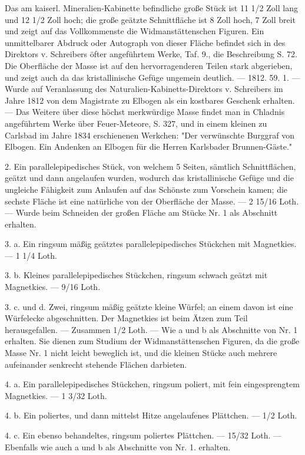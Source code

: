 \documentclass[a4paper, 11pt, oneside, polutonikogreek, german]{article}
\begin{document}
Das am kaiserl. Mineralien-Kabinette befindliche große Stück ist 11 1/2 Zoll lang und 12 1/2 Zoll hoch; die große geätzte Schnittfläche ist 8 Zoll hoch, 7 Zoll breit und zeigt auf das Vollkommenste die Widmanstättenschen Figuren. Ein unmittelbarer Abdruck oder Autograph von dieser Fläche befindet sich in des Direktors v. Schreibers öfter angeführtem Werke, Taf. 9., die Beschreibung S. 72. Die Oberfläche der Masse ist auf den hervorragenderen Teilen stark abgerieben, und zeigt auch da das kristallinische Gefüge ungemein deutlich. — 1812. 59. 1. — Wurde auf Veranlassung des Naturalien-Kabinetts-Direktors v. Schreibers im Jahre 1812 von dem Magistrate zu Elbogen als ein kostbares Geschenk erhalten. — Das Weitere über diese höchst merkwürdige Masse findet man in Chladnis angeführtem Werke über Feuer-Meteore, S. 327, und in einem kleinen zu Carlsbad im Jahre 1834 erschienenen Werkchen: "Der verwünschte Burggraf von Elbogen. Ein Andenken an Elbogen für die Herren Karlsbader Brunnen-Gäste."

2. Ein parallelepipedisches Stück, von welchem 5 Seiten, sämtlich Schnittflächen, geätzt und dann angelaufen wurden, wodurch das kristallinische Gefüge und die ungleiche Fähigkeit zum Anlaufen auf das Schönste zum Vorschein kamen; die sechste Fläche ist eine natürliche von der Oberfläche der Masse. — 2 15/16 Loth. — Wurde beim Schneiden der großen Fläche am Stücke Nr. 1 als Abschnitt erhalten.

3. a. Ein ringsum mäßig geätztes parallelepipedisches Stückchen mit Magnetkies. — 1 1/4 Loth.

3. b. Kleines parallelepipedisches Stückchen, ringsum schwach geätzt mit Magnetkies. — 9/16 Loth.

3. c. und d. Zwei, ringsum mäßig geätzte kleine Würfel; an einem davon ist eine Würfelecke abgeschnitten. Der Magnetkies ist beim Ätzen zum Teil herausgefallen. — Zusammen 1/2 Loth. — Wie a und b als Abschnitte von Nr. 1 erhalten. Sie dienen zum Studium der Widmanstättenschen Figuren, da die große Masse Nr. 1 nicht leicht beweglich ist, und die kleinen Stücke auch mehrere aufeinander senkrecht stehende Flächen darbieten.

4. a. Ein parallelepipedisches Stückchen, ringsum poliert, mit fein eingesprengtem Magnetkies. — 1 3/32 Loth.

4. b. Ein poliertes, und dann mittelst Hitze angelaufenes Plättchen. — 1/2 Loth.

4. c. Ein ebenso behandeltes, ringsum poliertes Plättchen. — 15/32 Loth. — Ebenfalls wie auch a und b als Abschnitte von Nr. 1. erhalten.
\end{document}
